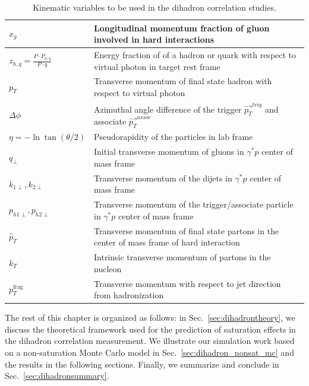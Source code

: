 \begin{table}
\centering
\begin{tabular}{ | l |  m{} |  } \hline
$x_{g}$	& Longitudinal momentum fraction of gluon involved in hard interactions \\ \hline
$z_{h,q}=\frac{P\cdot P_{h,q}}{P\cdot q}$	& Energy fraction of of a hadron or quark with respect to virtual photon in target rest frame \\ \hline
$p_{T}$ & Transverse momentum of final state hadron with respect to virtual photon \\ \hline
$\Delta\phi$ & Azimuthal angle difference of the trigger $\vec{p_{T}}^{trig}$ and associate $\vec{p_{T}}^{assoc}$ \\ \hline
$\eta =-\ln\tan(\theta/2)$ & Pseudorapidity of the particles in lab frame \\ \hline
$q_\perp$ & Initial transverse momentum of gluons in $\gamma^{*}p$ center of mass frame \\ \hline
$k_{1\perp}, k_{2\perp}$ &	Transverse momentum of the dijets in $\gamma^{*}p$ center of mass frame \\ \hline
$p_{h1\perp}, p_{h2\perp}$ &	Transverse momentum of the trigger/associate particle in $\gamma^{*}p$ center of mass frame \\ \hline
$\hat{p}_{T}$ & Transverse momentum of final state partons in the center of mass frame of hard interaction \\ \hline
$k_{T}$	& Intrinsic transverse momentum of partons in the nucleon \\ \hline
$p_{T}^{\textrm{frag}}$ & Transverse momentum with respect to jet direction from hadronization \\ \hline
\end{tabular}
\caption[ Kinematic variables to be used in the dihadron correlation studies]{ Kinematic variables to be used in the dihadron correlation studies. \label{tab:varDef} }
\end{table}


The rest of this chapter is organized as follows: in
Sec.~\ref{sec:dihadrontheory}, we discuss the theoretical framework used for the
prediction of saturation effects in the dihadron correlation measurement. We
illustrate our simulation work based on a non-saturation Monte Carlo model in
Sec.~\ref{sec:dihadron_nonsat_mc} and the results in the following sections.
Finally, we summarize and conclude in Sec.~\ref{sec:dihadronsummary}.




